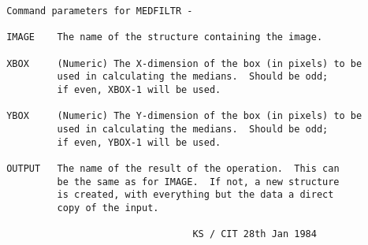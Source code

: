 \begin{description}
\begin{verbatim}
 Command parameters for MEDFILTR -

 IMAGE    The name of the structure containing the image.

 XBOX     (Numeric) The X-dimension of the box (in pixels) to be
          used in calculating the medians.  Should be odd;
          if even, XBOX-1 will be used.

 YBOX     (Numeric) The Y-dimension of the box (in pixels) to be
          used in calculating the medians.  Should be odd;
          if even, YBOX-1 will be used.

 OUTPUT   The name of the result of the operation.  This can
          be the same as for IMAGE.  If not, a new structure
          is created, with everything but the data a direct
          copy of the input.

                                  KS / CIT 28th Jan 1984
\end{verbatim}
\end{description}
